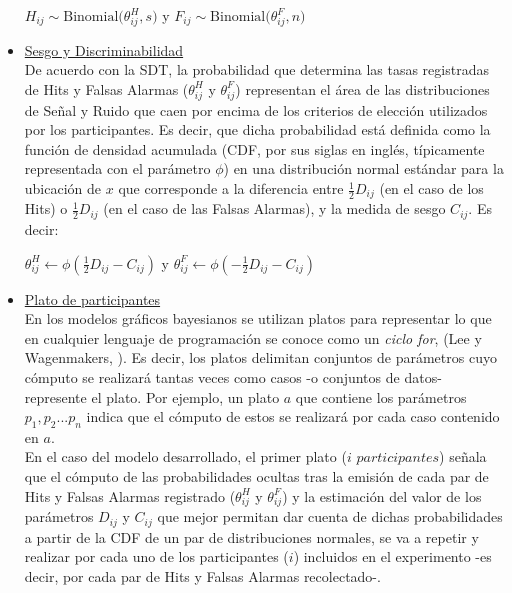 \begin{itemize}
\begin{center}
$H_{ij}\sim \mathrm{Binomial}\bigl(\theta^H_{ij}, s)$
y
$F_{ij}\sim \mathrm{Binomial}\bigl(\theta^F_{ij}, n)$\\
\end{center}

\item \underline{Sesgo y Discriminabilidad}\\

De acuerdo con la SDT, la probabilidad que determina las tasas registradas de Hits y Falsas Alarmas ($\theta^H_{ij}$ y $\theta^F_{ij}$) representan el área de las distribuciones de Señal y Ruido que caen por encima de los criterios de elección utilizados por los participantes. Es decir, que dicha probabilidad está definida como la función de densidad acumulada (CDF, por sus siglas en inglés, típicamente representada con el parámetro $\phi$) en una distribución normal estándar para la ubicación de $x$ que corresponde a la diferencia entre $\frac{1}{2}D_{ij}$ (en el caso de los Hits) o $\frac{1}{2}D_{ij}$ (en el caso de las Falsas Alarmas), y la medida de sesgo $C_{ij}$. Es decir:\\

\begin{center}
$\theta^H_{ij}\gets \phi (\frac{1}{2}D_{ij}-C_{ij})$
y
$\theta^F_{ij}\gets \phi (-\frac{1}{2}D_{ij}-C_{ij})$\\
\end{center}

\item \underline{Plato de participantes}\\

En los modelos gráficos bayesianos se utilizan platos para representar lo que en cualquier lenguaje de programación se conoce como un \textit{ciclo for}, (Lee y Wagenmakers, \citeyear{LeeBook}). Es decir, los platos delimitan conjuntos de parámetros cuyo cómputo se realizará tantas veces como casos -o conjuntos de datos- represente el plato. Por ejemplo, un plato $a$ que contiene los parámetros $p_1, p_2... p_n$ indica que el cómputo de estos se realizará por cada caso contenido en $a$.\\

En el caso del modelo desarrollado, el primer plato ($i$ $participantes$) señala que el cómputo de las probabilidades ocultas tras la emisión de cada par de Hits y Falsas Alarmas registrado ($\theta^H_{ij}$ y $\theta^F_{ij}$) y la estimación del valor de los parámetros $D_{ij}$ y $C_{ij}$ que mejor permitan dar cuenta de dichas probabilidades a partir de la CDF de un par de distribuciones normales, se va a repetir y realizar por cada uno de los participantes ($i$) incluidos en el experimento -es decir, por cada par de Hits y Falsas Alarmas recolectado-.\\


\end{itemize}
